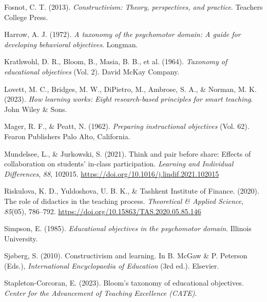 \documentclass[
  letterpaper,
  DIV=11,
  numbers=noendperiod]{scrartcl}
\newlength{\cslhangindent}
\newenvironment{CSLReferences}[2] %
 {\begin{list}{}{%
  \setlength{\itemindent}{0pt}
  \setlength{\leftmargin}{0pt}
  \setlength{\parsep}{0pt}
  \ifodd #1
   \setlength{\leftmargin}{\cslhangindent}
   \setlength{\itemindent}{-1\cslhangindent}
  \fi
  \setlength{\itemsep}{#2\baselineskip}}}
 {\end{list}}
\begin{document}
\begin{CSLReferences}{1}{0}
Fosnot, C. T. (2013). \emph{Constructivism: {Theory}, perspectives, and
practice}. Teachers College Press.

Harrow, A. J. (1972). \emph{A taxonomy of the psychomotor domain: {A}
guide for developing behavioral objectives}. Longman.

{Krathwohl, D. R., Bloom, B., Masia, B. B., et al.} (1964).
\emph{Taxonomy of educational objectives} (Vol. 2). David McKay Company.

Lovett, M. C., Bridges, M. W., DiPietro, M., Ambrose, S. A., \& Norman,
M. K. (2023). \emph{How learning works: {Eight} research-based
principles for smart teaching}. John Wiley \& Sons.

Mager, R. F., \& Peatt, N. (1962). \emph{Preparing instructional
objectives} (Vol. 62). Fearon Publishers Palo Alto, California.

Mundelsee, L., \& Jurkowski, S. (2021). Think and pair before share:
{Effects} of collaboration on students' in-class participation.
\emph{Learning and Individual Differences}, \emph{88}, 102015.
\url{https://doi.org/10.1016/j.lindif.2021.102015}

Riskulova, K. D., Yuldoshova, U. B. K., \& Tashkent Institute of
Finance. (2020). The role of didactics in the teaching process.
\emph{Theoretical \& Applied Science}, \emph{85}(05), 786--792.
\url{https://doi.org/10.15863/TAS.2020.05.85.146}

Simpson, E. (1985). \emph{Educational objectives in the psychomotor
domain}. Illinois University.

Sjøberg, S. (2010). Constructivism and learning. In B. McGaw \& P.
Peterson (Eds.), \emph{International {Encyclopaedia} of {Education}}
(3rd ed.). Elsevier.

Stapleton-Corcoran, E. (2023). Bloom's taxonomy of educational
objectives. \emph{Center for the Advancement of Teaching Excellence
(CATE)}.

\end{CSLReferences}
\end{document}
